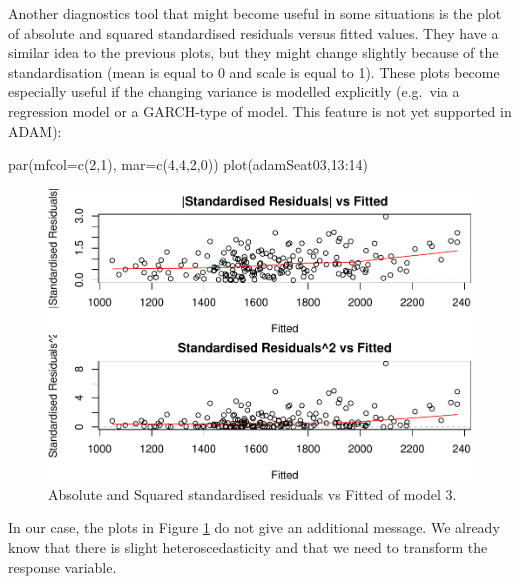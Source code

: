 \documentclass[
]{book}
\newenvironment{Shaded}{\begin{snugshade}}{\end{snugshade}}
\newcommand{\AttributeTok}[1]{\textcolor[rgb]{0.77,0.63,0.00}{#1}}
\newcommand{\DecValTok}[1]{\textcolor[rgb]{0.00,0.00,0.81}{#1}}
\newcommand{\FunctionTok}[1]{\textcolor[rgb]{0.00,0.00,0.00}{#1}}
\newcommand{\NormalTok}[1]{#1}
\newcommand{\SpecialCharTok}[1]{\textcolor[rgb]{0.00,0.00,0.00}{#1}}
\theoremstyle{definition}
\theoremstyle{definition}
\theoremstyle{definition}
\theoremstyle{definition}
\theoremstyle{remark}
\begin{document}
Another diagnostics tool that might become useful in some situations is the plot of absolute and squared standardised residuals versus fitted values. They have a similar idea to the previous plots, but they might change slightly because of the standardisation (mean is equal to 0 and scale is equal to 1). These plots become especially useful if the changing variance is modelled explicitly (e.g.~via a regression model or a GARCH-type of model. This feature is not yet supported in ADAM):

\begin{Shaded}
\begin{Highlighting}[]
\FunctionTok{par}\NormalTok{(}\AttributeTok{mfcol=}\FunctionTok{c}\NormalTok{(}\DecValTok{2}\NormalTok{,}\DecValTok{1}\NormalTok{), }\AttributeTok{mar=}\FunctionTok{c}\NormalTok{(}\DecValTok{4}\NormalTok{,}\DecValTok{4}\NormalTok{,}\DecValTok{2}\NormalTok{,}\DecValTok{0}\NormalTok{))}
\FunctionTok{plot}\NormalTok{(adamSeat03,}\DecValTok{13}\SpecialCharTok{:}\DecValTok{14}\NormalTok{)}
\end{Highlighting}
\end{Shaded}

\begin{figure}
\centering
\includegraphics{Svetunkov--2022----ADAM_files/figure-latex/adamSeat03HeteroStd-1.pdf}
\caption{\label{fig:adamSeat03HeteroStd}Absolute and Squared standardised residuals vs Fitted of model 3.}
\end{figure}

In our case, the plots in Figure \ref{fig:adamSeat03HeteroStd} do not give an additional message. We already know that there is slight heteroscedasticity and that we need to transform the response variable.
\end{document}
